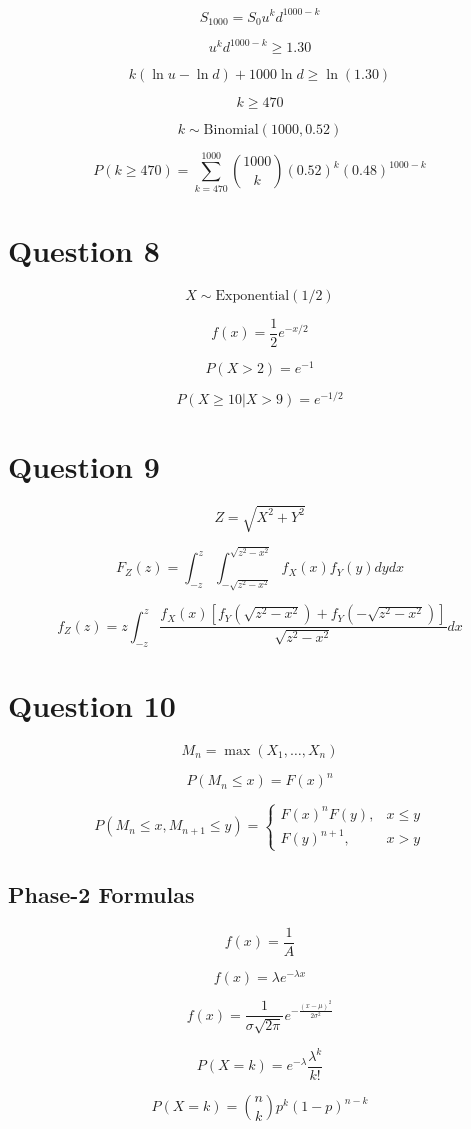 \documentclass[12pt]{article}
\begin{document}
\[
S_{1000}=S_0 u^k d^{1000-k}
\]

\[
u^k d^{1000-k} \ge 1.30
\]

\[
k(\ln u-\ln d)+1000\ln d \ge \ln(1.30)
\]

\[
k \ge 470
\]

\[
k \sim \text{Binomial}(1000,0.52)
\]

\[
P(k \ge 470)=\sum_{k=470}^{1000}\binom{1000}{k}(0.52)^k(0.48)^{1000-k}
\]

\section*{Question 8}

\[
X \sim \text{Exponential}(1/2)
\]

\[
f(x)=\frac{1}{2}e^{-x/2}
\]

\[
P(X>2)=e^{-1}
\]

\[
P(X\ge 10|X>9)=e^{-1/2}
\]

\section*{Question 9}

\[
Z=\sqrt{X^2+Y^2}
\]

\[
F_Z(z)=\int_{-z}^{z}\int_{-\sqrt{z^2-x^2}}^{\sqrt{z^2-x^2}} f_X(x)f_Y(y)dydx
\]

\[
f_Z(z)=z\int_{-z}^{z} \frac{f_X(x)\left[f_Y(\sqrt{z^2-x^2})+f_Y(-\sqrt{z^2-x^2})\right]}{\sqrt{z^2-x^2}}dx
\]

\section*{Question 10}

\[
M_n=\max(X_1,\dots,X_n)
\]

\[
P(M_n \le x)=F(x)^n
\]

\[
P(M_n \le x, M_{n+1} \le y)=
\begin{cases}
F(x)^n F(y), & x \le y \\
F(y)^{n+1}, & x>y
\end{cases}
\]

\vspace{4mm}

\subsection*{Phase-2 Formulas}

\vspace{2mm}

\[
f(x)=\frac{1}{A}
\]

\[
f(x)=\lambda e^{-\lambda x}
\]

\[
f(x)=\frac{1}{\sigma\sqrt{2\pi}}e^{-\frac{(x-\mu)^2}{2\sigma^2}}
\]

\[
P(X=k)=e^{-\lambda}\frac{\lambda^k}{k!}
\]

\[
P(X=k)=\binom{n}{k}p^k(1-p)^{n-k}
\]
\end{document}
